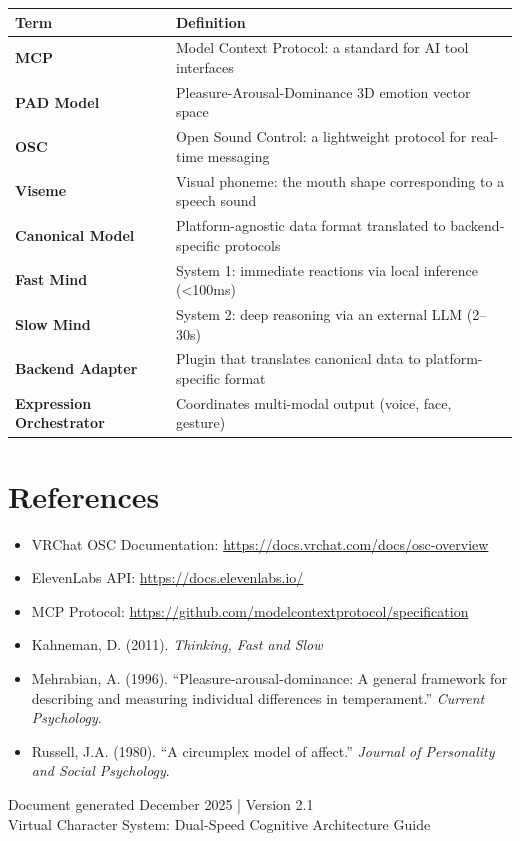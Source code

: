 \documentclass[11pt,letterpaper]{article}
\renewcommand{\arraystretch}{1.3}
\begin{document}
\begin{center}
\renewcommand{\arraystretch}{1.25}
\begin{tabular}{@{}L{3.8cm}L{10cm}@{}}
\toprule
\textbf{Term} & \textbf{Definition} \\
\midrule
\textbf{MCP} & Model Context Protocol: a standard for AI tool interfaces \\
\textbf{PAD Model} & Pleasure-Arousal-Dominance 3D emotion vector space \\
\textbf{OSC} & Open Sound Control: a lightweight protocol for real-time messaging \\
\textbf{Viseme} & Visual phoneme: the mouth shape corresponding to a speech sound \\
\textbf{Canonical Model} & Platform-agnostic data format translated to backend-specific protocols \\
\textbf{Fast Mind} & System 1: immediate reactions via local inference (<100ms) \\
\textbf{Slow Mind} & System 2: deep reasoning via an external LLM (2--30s) \\
\textbf{Backend Adapter} & Plugin that translates canonical data to platform-specific format \\
\textbf{Expression Orchestrator} & Coordinates multi-modal output (voice, face, gesture) \\
\bottomrule
\end{tabular}
\end{center}

\section{References}

\begin{itemize}
  \item VRChat OSC Documentation: \url{https://docs.vrchat.com/docs/osc-overview}
  \item ElevenLabs API: \url{https://docs.elevenlabs.io/}
  \item MCP Protocol: \url{https://github.com/modelcontextprotocol/specification}
  \item Kahneman, D. (2011). \textit{Thinking, Fast and Slow}
  \item Mehrabian, A. (1996). ``Pleasure-arousal-dominance: A general framework for describing and measuring individual differences in temperament.'' \textit{Current Psychology}.
  \item Russell, J.A. (1980). ``A circumplex model of affect.'' \textit{Journal of Personality and Social Psychology}.
\end{itemize}

\vfill
\begin{center}
\textcolor{coolgray}{\small\sffamily
Document generated December 2025 | Version 2.1\\
Virtual Character System: Dual-Speed Cognitive Architecture Guide
}
\end{center}
\end{document}
